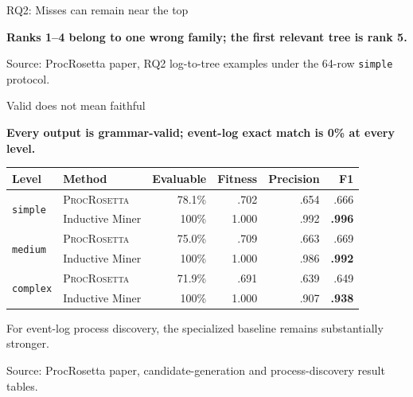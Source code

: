 \documentclass[aspectratio=169,12pt]{beamer}
\newcommand{\model}{\textsc{ProcRosetta}\xspace}
\newcommand{\best}[1]{\textbf{#1}}
\newcommand{\paperfigure}[1]{%
  \begingroup
  \newenvironment{figure*}[1][]{\par\centering}{\par}
  \renewcommand{\caption}[1]{}
  \renewcommand{\label}[1]{}
  
  \endgroup
}
\newcommand{\source}[1]{\vfill{\tiny\color{prgray}Source: #1\par}}
\newcommand{\keyline}[1]{%
  \begin{center}
  \colorbox{prlightteal}{\parbox{0.91\textwidth}{\centering\bfseries\color{prnavy}#1}}
  \end{center}
}
\begin{document}
\begin{frame}[t]{RQ2: Misses can remain near the top}
  \vspace{-3mm}
  \begin{center}
    \begin{minipage}{0.72\textwidth}
      \paperfigure{figures/rq2-qualitative-retrieval}
    \end{minipage}
  \end{center}
  \vspace{-3mm}
  \centering\small\bfseries
  Ranks 1--4 belong to one wrong family; the first relevant tree is rank 5.
  \source{ProcRosetta paper, RQ2 log-to-tree examples under the 64-row \texttt{simple} protocol.}
\end{frame}

\begin{frame}[t]{Valid does not mean faithful}
  \vspace{0mm}
  \keyline{Every output is grammar-valid; event-log exact match is 0\% at every level.}
  \vspace{1mm}
  \centering
  \footnotesize
  \setlength{\tabcolsep}{4.2pt}
  \begin{tabular}{@{}llrrrr@{}}
    \toprule
    Level & Method & Evaluable & Fitness & Precision & F1 \\
    \midrule
    \multirow{2}{*}{\texttt{simple}}
      & \model & 78.1\% & .702 & .654 & .666 \\
      & Inductive Miner & 100\% & 1.000 & .992 & \best{.996} \\
    \midrule
    \multirow{2}{*}{\texttt{medium}}
      & \model & 75.0\% & .709 & .663 & .669 \\
      & Inductive Miner & 100\% & 1.000 & .986 & \best{.992} \\
    \midrule
    \multirow{2}{*}{\texttt{complex}}
      & \model & 71.9\% & .691 & .639 & .649 \\
      & Inductive Miner & 100\% & 1.000 & .907 & \best{.938} \\
    \bottomrule
  \end{tabular}
  \par\vspace{3mm}
  \small For event-log process discovery, the specialized baseline remains substantially stronger.
  \source{ProcRosetta paper, candidate-generation and process-discovery result tables.}
\end{frame}
\end{document}
